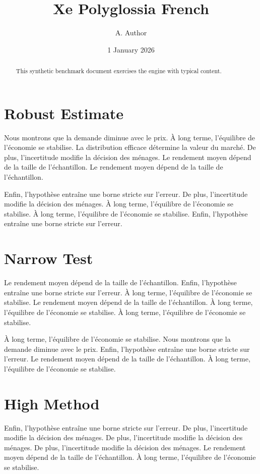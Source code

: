 \documentclass[11pt]{article}
\title{Xe Polyglossia French}
\author{A. Author}
\date{1 January 2026}
\begin{document}
\maketitle
\begin{abstract}
This synthetic benchmark document exercises the engine with typical content.
\end{abstract}
\tableofcontents
\section{Robust Estimate}\label{sec:1}

Nous montrons que la demande diminue avec le prix. À long terme, l'équilibre de l'économie se stabilise. La distribution efficace détermine la valeur du marché. De plus, l'incertitude modifie la décision des ménages. Le rendement moyen dépend de la taille de l'échantillon. Le rendement moyen dépend de la taille de l'échantillon.

Enfin, l'hypothèse entraîne une borne stricte sur l'erreur. De plus, l'incertitude modifie la décision des ménages. À long terme, l'équilibre de l'économie se stabilise. À long terme, l'équilibre de l'économie se stabilise. Enfin, l'hypothèse entraîne une borne stricte sur l'erreur.

\section{Narrow Test}\label{sec:2}

Le rendement moyen dépend de la taille de l'échantillon. Enfin, l'hypothèse entraîne une borne stricte sur l'erreur. À long terme, l'équilibre de l'économie se stabilise. Le rendement moyen dépend de la taille de l'échantillon. À long terme, l'équilibre de l'économie se stabilise. À long terme, l'équilibre de l'économie se stabilise.

À long terme, l'équilibre de l'économie se stabilise. Nous montrons que la demande diminue avec le prix. Enfin, l'hypothèse entraîne une borne stricte sur l'erreur. Le rendement moyen dépend de la taille de l'échantillon. À long terme, l'équilibre de l'économie se stabilise.

\section{High Method}\label{sec:3}

Enfin, l'hypothèse entraîne une borne stricte sur l'erreur. De plus, l'incertitude modifie la décision des ménages. De plus, l'incertitude modifie la décision des ménages. De plus, l'incertitude modifie la décision des ménages. Le rendement moyen dépend de la taille de l'échantillon. À long terme, l'équilibre de l'économie se stabilise.
\end{document}
